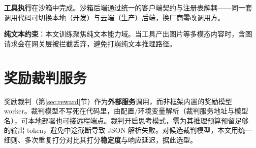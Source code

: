 \textbf{工具执行}在沙箱中完成。沙箱后端通过统一的客户端契约与注册表解耦——同一套调用代码可切换本地（开发）与云端（生产）后端，换厂商零改调用方。

\textbf{纯文本约束}：本文训练聚焦纯文本能力域。当工具产出图片等多模态内容时，含图请求会在网关层被拦截丢弃，避免打崩纯文本推理路径。

\section{奖励裁判服务}

奖励裁判（第\ref{sec:reward}节）作为\textbf{外部服务}调用，而非框架内置的奖励模型 worker。裁判模型不写死在代码里，由配置/环境变量解析（裁判服务地址与模型名），可本地部署也可接远程端点。裁判开启思考模式，需为其推理预算预留足够的输出 token，避免中途截断导致 JSON 解析失败。对候选裁判模型，本文用统一细则、多次重复打分对比其打分\textbf{稳定度}与响应延迟，据此选型。
